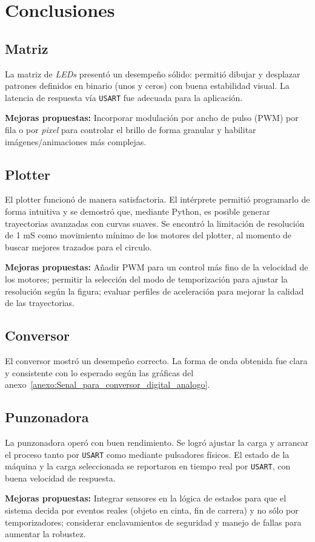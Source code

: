 \newpage

\section{Conclusiones}

\subsection{Matriz}
La matriz de \textit{LEDs} presentó un desempeño sólido: permitió dibujar y desplazar patrones definidos en binario (unos y ceros) con buena estabilidad visual. La latencia de respuesta vía \texttt{USART} fue adecuada para la aplicación. 

\textbf{Mejoras propuestas:} Incorporar modulación por ancho de pulso (PWM) por fila o por \textit{pixel} para controlar el brillo de forma granular y habilitar imágenes/animaciones más complejas.

\subsection{Plotter}
El plotter funcionó de manera satisfactoria. El intérprete permitió programarlo de forma intuitiva y se demostró que, mediante Python, es posible generar trayectorias avanzadas con curvas suaves. Se encontró la limitación de resolución de 1 mS como movimiento mínimo de los motores del plotter, al momento de buscar mejores trazados para el circulo.

\textbf{Mejoras propuestas:} Añadir PWM para un control más fino de la velocidad de los motores; permitir la selección del modo de temporización para ajustar la resolución según la figura; evaluar perfiles de aceleración para mejorar la calidad de las trayectorias.

\subsection{Conversor}
El conversor mostró un desempeño correcto. La forma de onda obtenida fue clara y consistente con lo esperado según las gráficas del anexo~\ref{anexo:Senal_para_conversor_digital_analogo}. 

\subsection{Punzonadora}
La punzonadora operó con buen rendimiento. Se logró ajustar la carga y arrancar el proceso tanto por \texttt{USART} como mediante pulsadores físicos. El estado de la máquina y la carga seleccionada se reportaron en tiempo real por \texttt{USART}, con buena velocidad de respuesta.

\textbf{Mejoras propuestas:} Integrar sensores en la lógica de estados para que el sistema decida por eventos reales (objeto en cinta, fin de carrera) y no sólo por temporizadores; considerar enclavamientos de seguridad y manejo de fallas para aumentar la robustez.

\newpage